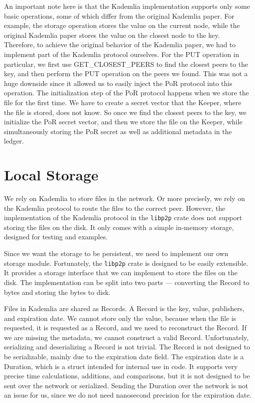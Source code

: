 An important note here is that the Kademlia implementation supports only some basic operations,
some of which differ from the original Kademlia paper.
For example, the storage operation stores the value on the current node,
while the original Kademlia paper stores the value on the closest node to the key.
Therefore, to achieve the original behavior of the Kademlia paper,
we had to implement part of the Kademlia protocol ourselves.
For the PUT operation in particular, we first use GET\_CLOSEST\_PEERS to find the closest peers to the key,
and then perform the PUT operation on the peers we found.
This was not a huge downside since it allowed us to easily inject the PoR protocol into this operation.
The initialization step of the PoR protocol happens when we store the file for the first time.
We have to create a secret vector that the Keeper, where the file is stored, does not know.
So once we find the closest peers to the key, we initialize the PoR secret vector,
and then we store the file on the Keeper,
while simultaneously storing the PoR secret as well as additional metadata in the ledger.

\section{Local Storage}

We rely on Kademlia to store files in the network.
Or more precisely, we rely on the Kademlia protocol to route the files to the correct peer.
However, the implementation of the Kademlia protocol in
the \texttt{libp2p} crate does not support storing the files on the disk.
It only comes with a simple in-memory storage, designed for testing and examples.

Since we want the storage to be persistent, we need to implement our own storage module.
Fortunately, the \texttt{libp2p} crate is designed to be easily extensible.
It provides a storage interface that we can implement to store the files on the disk.
The implementation can be split into two parts --- converting the Record to bytes
and storing the bytes to disk.

Files in Kademlia are shared as Records.
A Record is the key, value, publishers, and expiration date.
We cannot store only the value, because when the file is requested,
it is requested as a Record, and we need to reconstruct the Record.
If we are missing the metadata, we cannot construct a valid Record.
Unfortunately, serializing and deserializing a Record is not trivial.
The Record is not designed to be serializable, mainly due to the expiration date field.
The expiration date is a Duration, which is a struct intended for internal use in code.
It supports very precise time calculations, additions, and comparisons,
but it is not designed to be sent over the network or serialized.
Sending the Duration over the network is not an issue for us,
since we do not need nanosecond precision for the expiration date.

